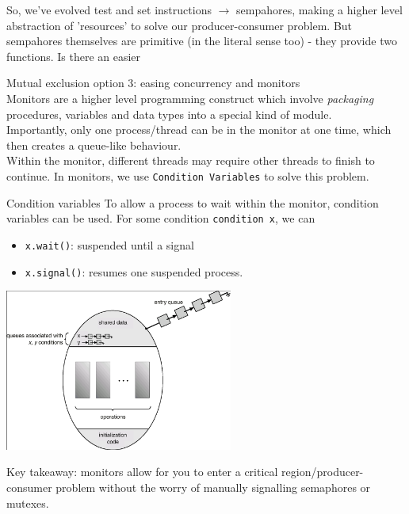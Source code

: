 \documentclass[journal, letterpaper]{IEEEtran}
\begin{document}
So, we've evolved test and set instructions $\rightarrow$ sempahores, making a higher level abstraction of 'resources' to solve our producer-consumer problem. But sempahores themselves are primitive (in the literal sense too) - they provide
two functions. Is there an easier 

\begin{theory}{Mutual exclusion option 3: easing concurrency and monitors} \\
    Monitors are a higher level programming construct which involve \textit{packaging} procedures, variables and data types into a special kind of module.
    \newline \\ 
    Importantly, only one process/thread can be in the monitor at one time, which then creates a queue-like behaviour.
    \newline \\ 
    Within the monitor, different threads may require other threads to finish to continue. In monitors, we use \verb|Condition Variables| to solve this problem.
    \begin{aside}{Condition variables}
        To allow a process to wait within the monitor, condition variables can be used.
        \newline For some condition \verb|condition x|, we can
        \begin{itemize}
            \item \verb|x.wait()|: suspended until a signal
            \item \verb|x.signal()|: resumes one suspended process.
        \end{itemize}
    \end{aside}
    \begin{center}
        \includegraphics[width=7.5cm]{./photos/monitor.png}
    \end{center}
    \begin{center}
    Key takeaway: monitors allow for you to enter a critical region/producer-consumer problem without the worry of manually signalling semaphores or mutexes.
    \end{center}
\end{theory}
\end{document}
